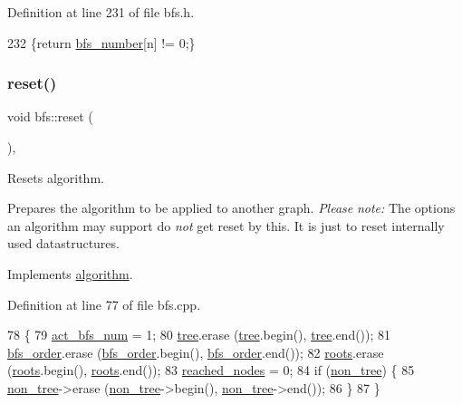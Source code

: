 Definition at line 231 of file bfs.\+h.


\begin{DoxyCode}
232     \{\textcolor{keywordflow}{return} \mbox{\hyperlink{classbfs_a59d0c5c5ad2715776b20b1aec03dbc3a}{bfs\_number}}[n] != 0;\}
\end{DoxyCode}
\mbox{\label{classbfs_a6398bc230f9723cd5fdd32cd603647cc}} 
\subsubsection{\texorpdfstring{reset()}{reset()}}
{\footnotesize\ttfamily void bfs\+::reset (\begin{DoxyParamCaption}{ }\end{DoxyParamCaption})\hspace{0.3cm}{\ttfamily [virtual]}, {\ttfamily [inherited]}}



Resets algorithm. 

Prepares the algorithm to be applied to another graph. {\itshape Please} {\itshape note\+:} The options an algorithm may support do {\itshape not} get reset by this. It is just to reset internally used datastructures. 

Implements \mbox{\hyperlink{classalgorithm_a21aba63d066ae7897de6ca7d8425c408}{algorithm}}.



Definition at line 77 of file bfs.\+cpp.


\begin{DoxyCode}
78 \{
79     \mbox{\hyperlink{classbfs_a5a4adad9562896536b8b58ab237e8478}{act\_bfs\_num}} = 1;
80     \mbox{\hyperlink{classbfs_a8bc83afea6d1066ea4ceca3007799912}{tree}}.erase (\mbox{\hyperlink{classbfs_a8bc83afea6d1066ea4ceca3007799912}{tree}}.begin(), \mbox{\hyperlink{classbfs_a8bc83afea6d1066ea4ceca3007799912}{tree}}.end());
81     \mbox{\hyperlink{classbfs_a2596d2cf52f6e7922fd94ce1adde760e}{bfs\_order}}.erase (\mbox{\hyperlink{classbfs_a2596d2cf52f6e7922fd94ce1adde760e}{bfs\_order}}.begin(), \mbox{\hyperlink{classbfs_a2596d2cf52f6e7922fd94ce1adde760e}{bfs\_order}}.end());
82     \mbox{\hyperlink{classbfs_acea071a6fdad8e590b40830ced241824}{roots}}.erase (\mbox{\hyperlink{classbfs_acea071a6fdad8e590b40830ced241824}{roots}}.begin(), \mbox{\hyperlink{classbfs_acea071a6fdad8e590b40830ced241824}{roots}}.end());
83     \mbox{\hyperlink{classbfs_ac3db80b59d5db049199936445a6c2da8}{reached\_nodes}} = 0;
84     \textcolor{keywordflow}{if} (\mbox{\hyperlink{classbfs_a056b2131db11e62eb8f41c8dcc117d2e}{non\_tree}}) \{
85     \mbox{\hyperlink{classbfs_a056b2131db11e62eb8f41c8dcc117d2e}{non\_tree}}->erase (\mbox{\hyperlink{classbfs_a056b2131db11e62eb8f41c8dcc117d2e}{non\_tree}}->begin(), \mbox{\hyperlink{classbfs_a056b2131db11e62eb8f41c8dcc117d2e}{non\_tree}}->end());
86     \}
87 \}
\end{DoxyCode}
\mbox{\label{classbfs_a45d58d06d0dcd6427edad2ec52a6ebb9}} 
